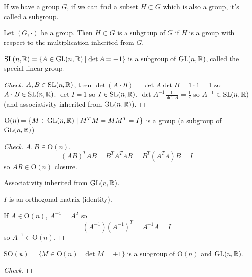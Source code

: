 \documentclass[10pt, a4paper]{article}
\begin{document}
If we have a group $G$,
if we can find a subset $H \subset G$ which is also a group,
it's called a subgroup.

\begin{definition}
    Let $(G, \cdot)$ be a group.
    Then $H \subset G$ is a subgroup of $G$ if $H$ is a group with respect to the multiplication inherited from $G$.
\end{definition}

\begin{example}
    $\mathrm{SL}(n, \mathbb{R}) = \{A \in \mathrm{GL}(n, \mathbb{R})\mid \det{A} = +1\}$ is a subgroup of $\mathrm{GL}(n, \mathbb{R})$,
    called the special linear group.

    \begin{proof}[Check]\renewcommand{\qedsymbol}{}
        $A, B \in \mathrm{SL}(n, \mathbb{R})$,
        then $\det(A\cdot B) = \det{A}\det{B} = 1 \cdot 1 = 1$ so $A\cdot B \in \mathrm{SL}(n, \mathbb{R})$.
        $\det{I} = 1$ so $I \in \mathrm{SL}(n, \mathbb{R})$,
        $\det{A ^ {-1}} \frac{1}{\det{A}} = \frac{1}{2}$ so $A ^ {-1} \in \mathrm{SL}(n, \mathbb{R})$
        (and associativity inherited from $\mathrm{GL}(n, \mathbb{R})$).
    \end{proof}
\end{example}

\begin{example}
    $\mathrm{O}(n) = \{M \in \mathrm{GL}(n, \mathbb{R})\mid M ^ TM = MM ^ T = I\}$ is a group
    (a subgroup of $\mathrm{GL}(n, \mathbb{R})$)
    
    \begin{proof}[Check]\renewcommand{\qedsymbol}{}
        $A, B \in \mathrm{O}(n)$,
        \[
        (AB) ^ TAB = B ^ TA ^ TAB = B ^ T(A ^ TA)B = I
        \]
        so $AB \in \mathrm{O}(n)$ closure.
        
        Associativity inherited from $\mathrm{GL}(n, \mathbb{R})$.

        $I$ is an orthogonal matrix
        (identity).

        If $A \in \mathrm{O}(n)$,
        $A ^ {-1} = A ^ T$ so
        \[
        (A ^ {-1})(A ^ {-1}) ^ T = A ^ {-1}A = I
        \]
        so $A ^ {-1} \in \mathrm{O}(n)$.
    \end{proof}
\end{example}

\begin{example}
    $\mathrm{SO}(n) = \{M \in \mathrm{O}(n)\mid \det{M} = +1\}$
    is a subgroup of $\mathrm{O}(n)$ and $\mathrm{GL}(n, \mathbb{R})$.

    \begin{proof}[Check]\renewcommand{\qedsymbol}{}

    \end{proof}
\end{example}
\end{document}
